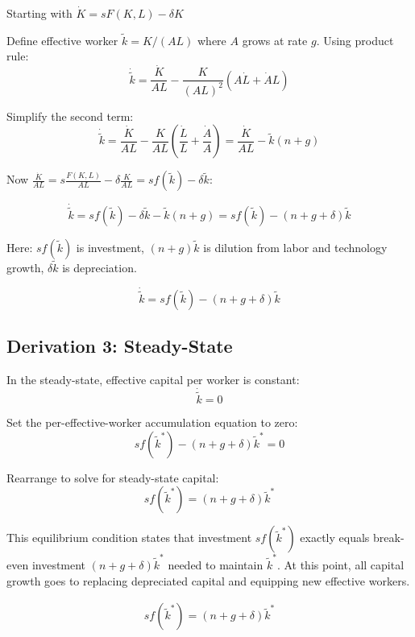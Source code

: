 \documentclass[a4paper,11pt]{article}
\newcommand{\ktilde}{\tilde{k}}
\begin{document}
\begin{derivationbox}
Starting with $\dot{K} = sF(K,L) - \delta K$

Define effective worker $\ktilde = K/(AL)$ where $A$ grows at rate $g$. Using product rule:
\[
\dot{\ktilde} = \frac{\dot{K}}{AL} - \frac{K}{(AL)^2}(A\dot{L} + \dot{A}L)
\]

Simplify the second term:
\[
\dot{\ktilde} = \frac{\dot{K}}{AL} - \frac{K}{AL}\left(\frac{\dot{L}}{L} + \frac{\dot{A}}{A}\right) = \frac{\dot{K}}{AL} - \ktilde(n+g)
\]

Now $\frac{\dot{K}}{AL} = s\frac{F(K,L)}{AL} - \delta\frac{K}{AL} = s f(\ktilde) - \delta \ktilde$:

\[
\dot{\ktilde} = s f(\ktilde) - \delta \ktilde - \ktilde(n+g) = s f(\ktilde) - (n+g+\delta)\ktilde
\]

Here: $sf(\ktilde)$ is investment, $(n+g)\ktilde$ is dilution from labor and technology growth, $\delta \ktilde$ is depreciation.
\end{derivationbox}

\begin{resultbox}
\[
\boxed{\dot{\ktilde} = sf(\ktilde) - (n + g + \delta)\ktilde}
\]
\end{resultbox}

\subsection{Derivation 3: Steady-State}

\begin{derivationbox}
In the steady-state, effective capital per worker is constant:
\[
\dot{\ktilde} = 0
\]

Set the per-effective-worker accumulation equation to zero:
\[
s f(\ktilde^*) - (n+g+\delta)\ktilde^* = 0
\]

Rearrange to solve for steady-state capital:
\[
s f(\ktilde^*) = (n+g+\delta)\ktilde^*
\]

This equilibrium condition states that investment $s f(\ktilde^*)$ exactly equals break-even investment $(n+g+\delta)\ktilde^*$ needed to maintain $\ktilde^*$. At this point, all capital growth goes to replacing depreciated capital and equipping new effective workers.
\end{derivationbox}

\begin{resultbox}
\begin{align*}
\boxed{s f(\ktilde^*) = (n + g + \delta)\ktilde^*}
\tag{SS}
\end{align*}
\end{resultbox}
\end{document}
